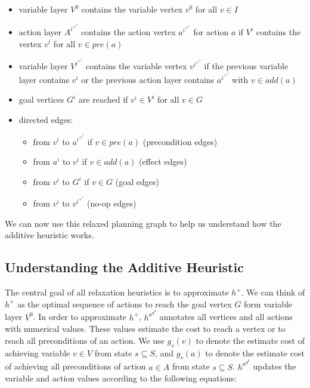 \begin{itemize}
\setlength\itemsep{0em}
\item variable layer $V^0$ contains the variable vertex $v^0$ for all $v \in I$
\item action layer $A^i^+^1$ contains the action vertex $a^i^+^1$ for action $a$ if $V^i$ contains the vertex $v^i$ for all $v \in pre(a)$
\item variable layer $V^i^+^1$ contains the variable vertex $v^i^+^1$ if the previous variable layer contains $v^i$ or the previous action layer contains $a^i^+^1$ with $v \in add(a)$
\item goal vertices $G^i$ are reached if $v^i \in V^i$ for all $v \in G$
\item directed edges:
\begin{itemize}
\setlength\itemsep{0em}
\item from $v^i$ to $a^i^+^1$ if $v \in pre(a)$ (precondition edges)
\item from $a^i$ to $v^i$ if $v \in add(a)$ (effect edges)
\item from $v^i$ to $G^i$ if $v \in G$ (goal edges)
\item from $v^i$ to $v^i^+^1$ (no-op edges) \quad\quad\quad\quad\quad\quad\quad\quad\quad\quad\quad\quad\quad\quad\quad\quad\quad\quad\quad\quad
\end{itemize}
\end{itemize}

We can now use this relaxed planning graph to help us understand how the additive heuristic works.

\subsection{Understanding the Additive Heuristic}

The central goal of all relaxation heuristics is to approximate $h^+$. We can think of $h^+$ as the optimal sequence of actions to reach the goal vertex $G$ form variable layer $V^0$. In order to approximate $h^+$, $h^a^d^d$ annotates all vertices and all actions with numerical values. These values estimate the cost to reach a vertex or to reach all preconditions of an action. We use $g_s(v)$ to denote the estimate cost of achieving variable $v \in V$ from state $s \subseteq S$, and $g_s(a)$ to denote the estimate cost of achieving all preconditions of action $a \in A$ from state $s \subseteq S$. $h^a^d^d$ updates the variable and action values according to the following equations:

